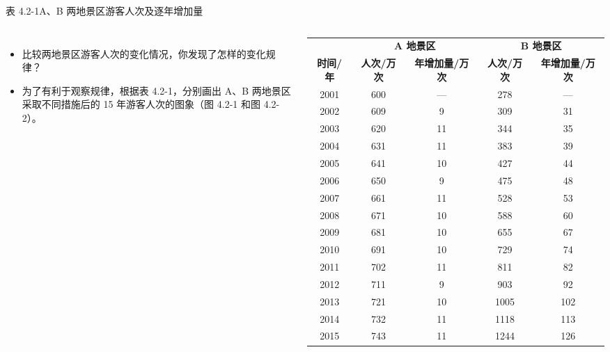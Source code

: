 \documentclass[aspectratio=169,11pt,t,fleqn]{ctexbeamer}
\begin{document}
\begin{frame}[t]{表 4.2-1\quad A、B 两地景区游客人次及逐年增加量}
  \centering\vspace{-2em}
  \begin{columns}
  	 \begin{itemize}
  		\item 比较两地景区游客人次的变化情况，你发现了怎样的变化规律？
  		\item<2-> 为了有利于观察规律，根据表 4.2-1，分别画出 A、B 两地景区采取不同措施后的 15 年游客人次的图象（图 4.2-1 和图 4.2-2）。
  	\end{itemize}
  	
  	
  	  \scriptsize
  	\renewcommand{\arraystretch}{1.0}
  	\begin{tabular}[t]{|c|c|c|c|c|}
  		\hline
  		\rowcolor{xyyg!60}
  		\multirow[c]{2}{*}{\cellcolor{xyyg!70} } &
  		\multicolumn{2}{c|}{\textbf{A 地景区}} &
  		\multicolumn{2}{c|}{\textbf{B 地景区}} \\
  		\cline{2-5}
  		\rowcolor{xyyg!50}
  		\cellcolor{xyyg!70}\textbf{时间/年}  & \textbf{人次/万次} & \textbf{年增加量/万次} & \textbf{人次/万次} & \textbf{年增加量/万次} \\
  		\hline
  		2001 & 600 & — & 278 & — \\
  		\hline
  		2002 & 609 & 9 & 309 & 31 \\
  		\hline
  		2003 & 620 & 11 & 344 & 35 \\
  		\hline
  		2004 & 631 & 11 & 383 & 39 \\
  		\hline
  		2005 & 641 & 10 & 427 & 44 \\
  		\hline
  		2006 & 650 & 9 & 475 & 48 \\
  		\hline
  		2007 & 661 & 11 & 528 & 53 \\
  		\hline
  		2008 & 671 & 10 & 588 & 60 \\
  		\hline
  		2009 & 681 & 10 & 655 & 67 \\
  		\hline
  		2010 & 691 & 10 & 729 & 74 \\
  		\hline
  		2011 & 702 & 11 & 811 & 82 \\
  		\hline
  		2012 & 711 & 9 & 903 & 92 \\
  		\hline
  		2013 & 721 & 10 & 1005 & 102 \\
  		\hline
  		2014 & 732 & 11 & 1118 & 113 \\
  		\hline
  		2015 & 743 & 11 & 1244 & 126 \\
  		\hline
  	\end{tabular}
  \end{columns}

  
\end{frame}
\end{document}
